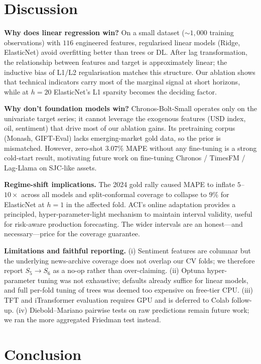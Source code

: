 \documentclass[conference]{IEEEtran}
\begin{document}
\section{Discussion}

\textbf{Why does linear regression win?} On a small dataset ($\sim$$1{,}000$ training observations) with $116$ engineered features, regularised linear models (Ridge, ElasticNet) avoid overfitting better than trees or DL. After lag transformation, the relationship between features and target is approximately linear; the inductive bias of L1/L2 regularisation matches this structure. Our ablation shows that technical indicators carry most of the marginal signal at short horizons, while at $h=20$ ElasticNet's L1 sparsity becomes the deciding factor.

\textbf{Why don't foundation models win?} Chronos-Bolt-Small operates only on the univariate target series; it cannot leverage the exogenous features (USD index, oil, sentiment) that drive most of our ablation gains. Its pretraining corpus (Monash, GIFT-Eval) lacks emerging-market gold data, so the prior is mismatched. However, zero-shot $3.07\%$ MAPE without any fine-tuning is a strong cold-start result, motivating future work on fine-tuning Chronos / TimesFM / Lag-Llama on SJC-like assets.

\textbf{Regime-shift implications.} The 2024 gold rally caused MAPE to inflate $5$--$10\times$ across all models and split-conformal coverage to collapse to $9\%$ for ElasticNet at $h=1$ in the affected fold. ACI's online adaptation provides a principled, hyper-parameter-light mechanism to maintain interval validity, useful for risk-aware production forecasting. The wider intervals are an honest---and necessary---price for the coverage guarantee.

\textbf{Limitations and faithful reporting.} (i) Sentiment features are columnar but the underlying news-archive coverage does not overlap our CV folds; we therefore report $S_5 \rightarrow S_6$ as a no-op rather than over-claiming. (ii) Optuna hyper-parameter tuning was not exhaustive; defaults already suffice for linear models, and full per-fold tuning of trees was deemed too expensive on free-tier CPU. (iii) TFT and iTransformer evaluation requires GPU and is deferred to Colab follow-up. (iv) Diebold--Mariano pairwise tests on raw predictions remain future work; we ran the more aggregated Friedman test instead.

\section{Conclusion}
\end{document}
